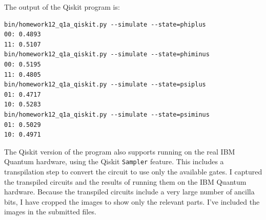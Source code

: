 \documentclass[12pt]{extarticle}
\begin{document}
\begin{enumerate}[(a)]
The output of the Qiskit program is:
\begin{verbatim}
bin/homework12_q1a_qiskit.py --simulate --state=phiplus
00: 0.4893
11: 0.5107
bin/homework12_q1a_qiskit.py --simulate --state=phiminus
00: 0.5195
11: 0.4805
bin/homework12_q1a_qiskit.py --simulate --state=psiplus
01: 0.4717
10: 0.5283
bin/homework12_q1a_qiskit.py --simulate --state=psiminus
01: 0.5029
10: 0.4971
\end{verbatim}














The Qiskit version of the program also supports running on the real IBM Quantum hardware, using the Qiskit \texttt{Sampler} feature.
This includes a transpilation step to convert the circuit to use only the available gates.
I captured the transpiled circuits and the results of running them on the IBM Quantum hardware.
Because the transpiled circuits include a very large number of ancilla bits, I have cropped the images to show only the relevant parts.
I've included the images in the submitted files.


\end{enumerate}
\end{document}
